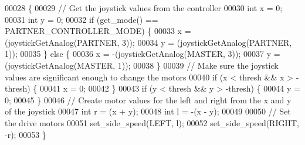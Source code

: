\begin{DoxyCode}
00028                            \{
00029   \textcolor{comment}{// Get the joystick values from the controller}
00030   \textcolor{keywordtype}{int} x = 0;
00031   \textcolor{keywordtype}{int} y = 0;
00032   \textcolor{keywordflow}{if} (get_mode() == PARTNER_CONTROLLER_MODE) \{
00033     x = (joystickGetAnalog(PARTNER, 3));
00034     y = (joystickGetAnalog(PARTNER, 1));
00035   \} \textcolor{keywordflow}{else} \{
00036     x = -(joystickGetAnalog(MASTER, 3));
00037     y = (joystickGetAnalog(MASTER, 1));
00038   \}
00039   \textcolor{comment}{// Make sure the joystick values are significant enough to change the motors}
00040   \textcolor{keywordflow}{if} (x < thresh && x > -thresh) \{
00041     x = 0;
00042   \}
00043   \textcolor{keywordflow}{if} (y < thresh && y > -thresh) \{
00044     y = 0;
00045   \}
00046   \textcolor{comment}{// Create motor values for the left and right from the x and y of the joystick}
00047   \textcolor{keywordtype}{int} r = (x + y);
00048   \textcolor{keywordtype}{int} l = -(x - y);
00049 
00050   \textcolor{comment}{// Set the drive motors}
00051   set_side_speed(LEFT, l);
00052   set_side_speed(RIGHT, -r);
00053 \}
\end{DoxyCode}
